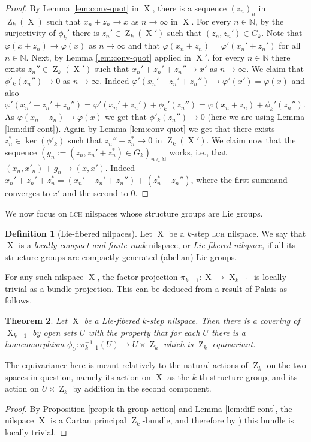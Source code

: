 \documentclass[a4paper,12pt,reqno]{amsart}
\newtheorem{theorem}{Theorem}[section]
\theoremstyle{definition}
\newtheorem{defn}[theorem]{Definition}
\def\to{\rightarrow}
\newcommand{\mb}{\mathbb}
\DeclareMathOperator{\ab}{Z}
\DeclareMathOperator{\ns}{X}
\begin{document}
\begin{proof}
By Lemma \ref{lem:conv-quot} in $\ns$, there is a sequence $(z_n)_n$ in $\ab_k(\ns)$ such that $x_n+z_n\to x$ as $n\to\infty$ in $\ns$. For every $n\in \mb{N}$, by the surjectivity of $\phi_k'$ there is $z_n'\in \ab_k(\ns')$ such that $(z_n,z_n')\in G_k$. Note that  $\varphi(x+z_n)\to\varphi(x)$ as $n\to\infty$ and that $\varphi(x_n+z_n)=\varphi'(x_n'+z_n')$ for all $n\in \mb{N}$. Next, by Lemma \ref{lem:conv-quot} applied in $\ns'$, for every $n\in \mb{N}$ there exists $z_n''\in \ab_k(\ns')$ such that $x_n'+z_n'+z_n''\to x'$ as $n\to\infty$. We claim that $\phi'_k(z_n'')\to 0$ as $n\to \infty$. Indeed $\varphi'(x_n'+z_n'+z_n'')\to \varphi'(x')=\varphi(x)$ and also $\varphi'(x_n'+z_n'+z_n'')=\varphi'(x_n'+z_n')+\phi_k'(z_n'')=\varphi(x_n+z_n)+\phi_k'(z_n'')$. As $\varphi(x_n+z_n)\to \varphi(x)$ we get that $\phi'_k(z_n'')\to 0$ (here we are using Lemma \ref{lem:diff-cont}). Again by Lemma \ref{lem:conv-quot} we get that there exists $z_n^*\in \ker(\phi'_k)$ such that $z_n''-z_n^*\to 0$ in $\ab_k(\ns')$. We claim now that the sequence $(g_n:=(z_n,z_n'+z_n^*)\in G_k)_{n\in\mb{N}}$ works, i.e., that $(x_n,x'_n)+g_n\to (x,x')$. Indeed  $x_n'+z_n'+z_n^*=(x_n'+z_n'+z_n'')+(z_n^*-z_n'')$, where the first summand converges to $x'$ and the second to $0$.
\end{proof}
We now focus on \textsc{lch} nilspaces whose structure groups are Lie groups.
\begin{defn}[Lie-fibered nilpaces]\label{def:lcfr-nil}
Let $\ns$ be a $k$-step \textsc{lch} nilspace. We say that $\ns$ is a \emph{locally-compact and finite-rank} nilspace, or \emph{Lie-fibered nilspace}, if all its structure groups are compactly generated (abelian) Lie groups.
\end{defn}
\noindent For any such nilspace $\ns$, the factor projection $\pi_{k-1}:\ns\to\ns_{k-1}$ is locally trivial as a bundle projection. This can be deduced from a result of Palais \cite[Theorem 2.3.3]{P61} as follows.
\begin{theorem}\label{thm:local-triviality-bundle}
Let $\ns$ be a Lie-fibered $k$-step nilspace. Then there is a covering of $\ns_{k-1}$ by open sets $U$ with the property that for each $U$ there is a homeomorphism $\phi_U:\pi_{k-1}^{-1}(U)\to U\times \ab_k$ which is $\ab_k$-equivariant. 
\end{theorem}
The equivariance here is meant relatively to the natural actions of $\ab_k$ on the two spaces in question, namely its action on $\ns$  as the $k$-th structure group, and its action  on $U\times \ab_k$ by addition in the second component.
\begin{proof}
By Proposition \ref{prop:k-th-group-action} and Lemma \ref{lem:diff-cont}, the nilspace $\ns$ is a Cartan principal $\ab_k$-bundle, and therefore by \cite[Theorem in \S 4]{P61}) this bundle is locally trivial.
\end{proof}
\end{document}
